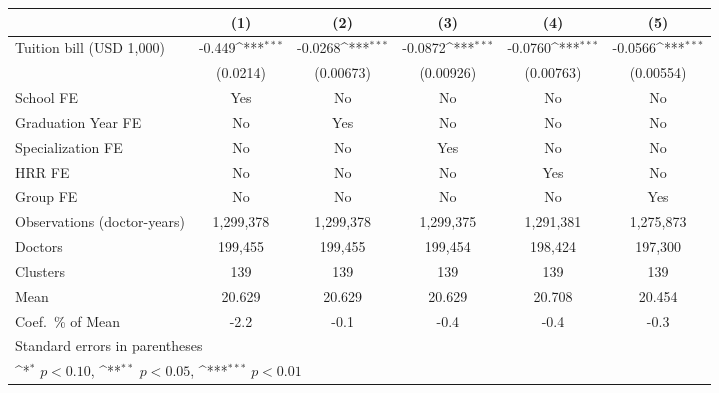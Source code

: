 {
\def\sym#1{\ifmmode^{#1}\else\(^{#1}\)\fi}
\begin{tabular}{l*{5}{c}}
\hline\hline
                    &\multicolumn{1}{c}{(1)}         &\multicolumn{1}{c}{(2)}         &\multicolumn{1}{c}{(3)}         &\multicolumn{1}{c}{(4)}         &\multicolumn{1}{c}{(5)}         \\
\hline
Tuition bill (USD 1,000)&      -0.449\sym{***}&     -0.0268\sym{***}&     -0.0872\sym{***}&     -0.0760\sym{***}&     -0.0566\sym{***}\\
                    &    (0.0214)         &   (0.00673)         &   (0.00926)         &   (0.00763)         &   (0.00554)         \\
[1em]
School FE           &         Yes         &          No         &          No         &          No         &          No         \\
[1em]
Graduation Year FE  &          No         &         Yes         &          No         &          No         &          No         \\
[1em]
Specialization FE   &          No         &          No         &         Yes         &          No         &          No         \\
[1em]
HRR FE              &          No         &          No         &          No         &         Yes         &          No         \\
[1em]
Group FE            &          No         &          No         &          No         &          No         &         Yes         \\
\hline
Observations (doctor-years)&   1,299,378         &   1,299,378         &   1,299,375         &   1,291,381         &   1,275,873         \\
Doctors             &     199,455         &     199,455         &     199,454         &     198,424         &     197,300         \\
Clusters            &         139         &         139         &         139         &         139         &         139         \\
Mean                &      20.629         &      20.629         &      20.629         &      20.708         &      20.454         \\
Coef.\ \% of Mean   &        -2.2         &        -0.1         &        -0.4         &        -0.4         &        -0.3         \\
\hline\hline
\multicolumn{6}{l}{\footnotesize Standard errors in parentheses}\\
\multicolumn{6}{l}{\footnotesize \sym{*} \(p<0.10\), \sym{**} \(p<0.05\), \sym{***} \(p<0.01\)}\\
\end{tabular}
}
